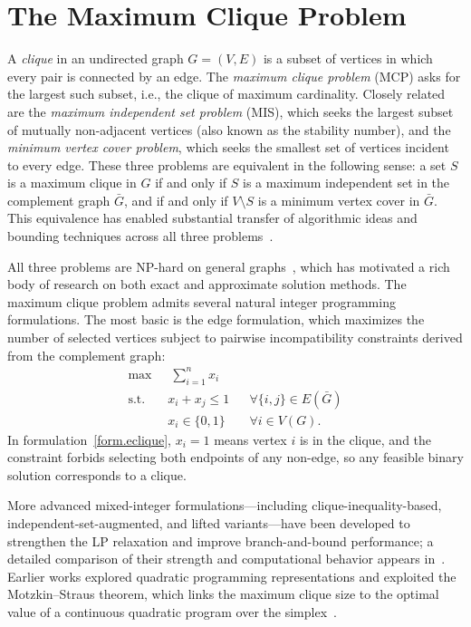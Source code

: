 \section{The Maximum Clique Problem}\label{sec.mcp}

A \emph{clique} in an undirected graph $G=(V,E)$ is a subset of
vertices in which every pair is connected by an edge. The \emph{maximum
clique problem} (MCP) asks for the largest such subset, i.e., the
clique of maximum cardinality. Closely related are the \emph{maximum
independent set problem} (MIS), which seeks the largest subset of
mutually non-adjacent vertices (also known as the stability number),
and the \emph{minimum vertex cover problem}, which seeks the smallest
set of vertices incident to every edge. These three problems are
equivalent in the following sense: a set $S$ is a maximum clique in
$G$ if and only if $S$ is a maximum independent set in the complement
graph $\bar{G}$, and if and only if $V \setminus S$ is a minimum
vertex cover in $\bar{G}$. This equivalence has enabled substantial
transfer of algorithmic ideas and bounding techniques across
all three problems~\citep{Bomze99survey}.

All three problems are NP-hard on general graphs~\citep{GareyJohnson79},
which has motivated a rich body of research on both exact and
approximate solution methods. The maximum clique problem admits several
natural integer programming formulations. The most basic is the
edge formulation, which maximizes the number of selected
vertices subject to pairwise incompatibility constraints derived from
the complement graph:
\begin{subequations}\label{form.eclique}
    \begin{align}
        \max &\ \sum_{i=1}^n x_i \label{ec.obj}\\
        \text{s.t.}\quad
        & x_i + x_j \le 1 && \forall \{i,j\} \in E(\bar{G})
            \label{ec.constraint}\\
        & x_i \in \{0,1\} && \forall i \in V(G).
    \end{align}
\end{subequations}
In formulation~\eqref{form.eclique}, $x_i=1$ means vertex $i$ is in the clique, and the constraint forbids selecting both endpoints of any non-edge, so any feasible binary solution corresponds to a clique. 

More advanced mixed-integer formulations---including
clique-inequality-based, independent-set-augmented, and lifted
variants---have been developed to strengthen the LP relaxation and
improve branch-and-bound performance; a detailed comparison of their
strength and computational behavior appears in~\citep{Naderi2022}.
Earlier works explored quadratic programming representations and
exploited the Motzkin--Straus theorem, which links the maximum clique
size to the optimal value of a continuous quadratic program over the
simplex~\citep{MotzkinStraus65, pardalos1987constrained, pardalos1994}.

